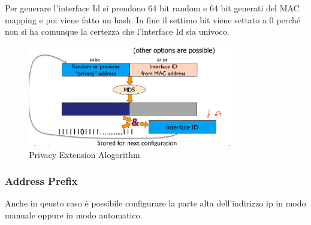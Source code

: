 \documentclass[12pt]{article}
\begin{document}
Per generare l'interface Id si prendono 64 bit random e 64 bit generati del MAC mapping e poi viene fatto un hash. In fine il settimo bit viene settato a 0 perch\'e non si ha comunque la certezza che l'interface Id sia univoco.
\begin{figure}[H]
    \centering
    \includegraphics[width=0.8\textwidth]{privacy-extension-alogorithm.png}
    \caption{Privacy Extension Alogorithm}
    \label{fig:privacy-extension-alogorithm}
\end{figure}


\subsubsection{Address Prefix}
Anche in qeusto caso \`e possibile configurare la parte alta dell'indirizzo ip in modo manuale oppure in modo automatico.
\end{document}
